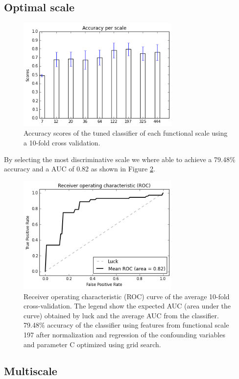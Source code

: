 \documentclass[12pt,journal,compsoc]{IEEEtran}
\begin{document}
\subsection{Optimal scale}


\begin{figure}[h]
\centering
\includegraphics[width=8cm]{acc_scale.png}
\caption{Accuracy scores of the tuned classifier of each functional scale using a 10-fold cross validation.}
\label{fig_scale_svm}
\end{figure}

By selecting the most discriminative scale we where able to achieve a 79.48\% accuracy and a AUC of 0.82 as shown in Figure \ref{fig_svc_norm_optimal_scale}.

\begin{figure}[h]
\centering
\includegraphics[width=8cm]{svc_linear_normalized_scale197x197.png}
\caption{Receiver operating characteristic (ROC) curve of the average 10-fold cross-validation. The legend show the expected AUC (area under the curve) obtained by luck and the average AUC from the classifier. 79.48\% accuracy of the classifier using features from functional scale 197 after normalization and regression of the confounding variables and parameter C optimized using grid search.}
\label{fig_svc_norm_optimal_scale}
\end{figure}

\subsection{Multiscale}
\end{document}

